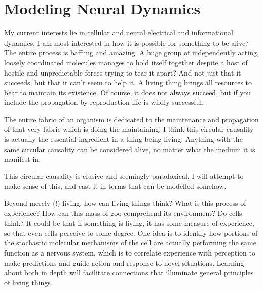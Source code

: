 \documentclass[12pt]{article}
\begin{document}
\maketitle

\section{Modeling Neural Dynamics}

My current interests lie in cellular and neural electrical and informational dynamics.  I am most interested in how it is possible for something to be alive?  The entire process is baffling and amazing.  A huge group of independently acting, loosely coordinated molecules manages to hold itself together despite a host of hostile and unpredictable forces trying to tear it apart?  And not just that it succeeds, but that it can't seem to help it.  A living thing brings all resources to bear to maintain its existence.  Of course, it does not always succeed, but if you include the propagation by reproduction life is wildly successful.

The entire fabric of an organism is dedicated to the maintenance and propagation of that very fabric which is doing the maintaining!  I think this circular causality is actually the essential ingredient in a thing being living.  Anything with the same circular causality can be considered alive, no matter what the medium it is manifest in.  

This circular causality is elusive and seemingly paradoxical.  I will attempt to make sense of this, and cast it in terms that can be modelled somehow.   

Beyond merely (!) living, how can living things think?  What is this process of experience?  How can this mass of goo comprehend its environment?  Do cells think?  It could be that if something is living, it has some measure of experience, so that even cells perceive to some degree.  One idea is to identify how portions of the stochastic molecular mechanisms of the cell are actually performing the same function as a nervous system, which is to correlate experience with perception to make predictions and guide action and response to novel situations.  Learning about both in depth will facilitate connections that illuminate general principles of living things.
\end{document}
